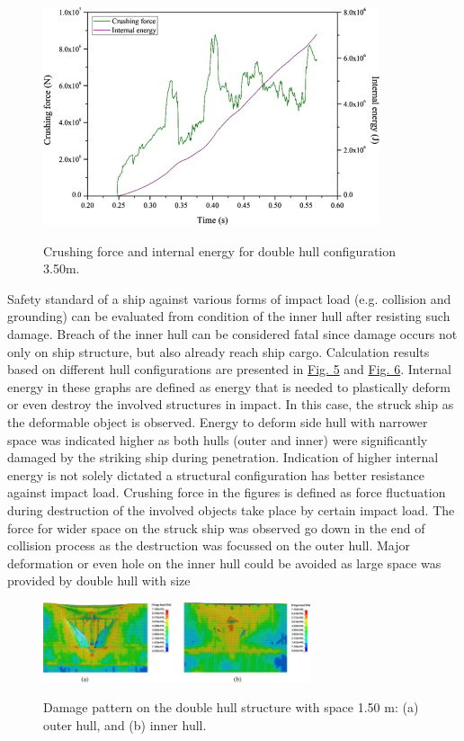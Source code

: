 \documentclass[../Final.tex]{subfiles}
\begin{document}
\begin{figure}[ht]
    \centering
    \includegraphics[width=\columnwidth]{fig6.jpg}
    \label{fig6}
    \caption{Crushing force and internal energy for double hull configuration 3.50m.}
\end{figure}

Safety standard of a ship against various forms of impact load (e.g. collision and grounding) can be evaluated from condition of the inner hull after resisting such damage. 
Breach of the inner hull can be considered fatal since damage occurs not only on ship structure, but also already reach ship cargo. Calculation results based on different hull configurations are presented in \hyperref[fig5]{Fig. 5} and \hyperref[fig6]{Fig. 6}. 
Internal energy in these graphs are defined as energy that is needed to plastically deform or even destroy the involved structures in impact. 
In this case, the struck ship as the deformable object is observed. Energy to deform side hull with narrower space was indicated higher as both hulls (outer and inner) were significantly damaged by the striking ship during penetration. 
Indication of higher internal energy is not solely dictated a structural configuration has better resistance against impact load. 
Crushing force in the figures is defined as force fluctuation during destruction of the involved objects take place by certain impact load. 
The force for wider space on the struck ship was observed go down in the end of collision process as the destruction was focussed on the outer hull. Major deformation or even hole on the inner hull could be 
avoided as large space was provided by double hull with size

\begin{figure}[ht]
    \centering
    \includegraphics[width=0.7\textwidth]{fig7.jpg}
    \label{fig7}
    \caption{Damage pattern on the double hull structure with space 1.50 m: (a) outer hull, and (b) inner hull.}
\end{figure}
\end{document}
